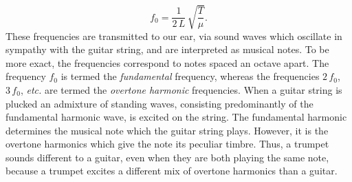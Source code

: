 \begin{equation}
f_0 = \frac{1}{2\,L}\,\sqrt{\frac{T}{\mu}}.
\end{equation}
These frequencies are transmitted to our ear, via sound waves which oscillate in
sympathy with the guitar string, and are interpreted as musical notes. To be
more exact, the frequencies correspond to  notes spaced an octave apart.
The frequency $f_0$ is termed the {\em fundamental} frequency, whereas the
frequencies $2\,f_0$, $3\,f_0$, {\em etc.} are termed the {\em overtone harmonic} frequencies. 
When a guitar string is plucked an admixture of standing waves, consisting predominantly
of the fundamental harmonic wave, is excited on the
string. The fundamental harmonic determines the musical note which the guitar string plays.
However, it is the overtone harmonics which give the note its peculiar timbre. Thus,
a trumpet sounds different to a guitar, even when they are both playing the same note, because
a trumpet excites a different mix of overtone harmonics than a guitar.

